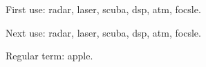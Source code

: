 \documentclass{article}
\begin{document}
First use: \gls{radar}, \gls{laser}, \gls{scuba}, \gls{dsp},
\gls{atm}, \gls{focsle}.

Next use: \gls{radar}, \gls{laser}, \gls{scuba}, \gls{dsp},
\gls{atm}, \gls{focsle}.

Regular term: \gls{apple}.

\printglossaries
\end{document}

